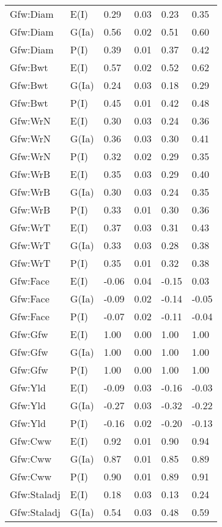 \begin{center}
\begin{longtable}{|p{1.1in}|p{0.7in}|p{0.7in}|p{0.6in}|p{0.6in}|p{0.6in}|}
  Gfw:Diam & E(I) & 0.29 & 0.03 & 0.23 & 0.35 \\ 
  Gfw:Diam & G(Ia) & 0.56 & 0.02 & 0.51 & 0.60 \\ 
  Gfw:Diam & P(I) & 0.39 & 0.01 & 0.37 & 0.42 \\ 
  Gfw:Bwt & E(I) & 0.57 & 0.02 & 0.52 & 0.62 \\ 
  Gfw:Bwt & G(Ia) & 0.24 & 0.03 & 0.18 & 0.29 \\ 
  Gfw:Bwt & P(I) & 0.45 & 0.01 & 0.42 & 0.48 \\ 
  Gfw:WrN & E(I) & 0.30 & 0.03 & 0.24 & 0.36 \\ 
  Gfw:WrN & G(Ia) & 0.36 & 0.03 & 0.30 & 0.41 \\ 
  Gfw:WrN & P(I) & 0.32 & 0.02 & 0.29 & 0.35 \\ 
  Gfw:WrB & E(I) & 0.35 & 0.03 & 0.29 & 0.40 \\ 
  Gfw:WrB & G(Ia) & 0.30 & 0.03 & 0.24 & 0.35 \\ 
  Gfw:WrB & P(I) & 0.33 & 0.01 & 0.30 & 0.36 \\ 
  Gfw:WrT & E(I) & 0.37 & 0.03 & 0.31 & 0.43 \\ 
  Gfw:WrT & G(Ia) & 0.33 & 0.03 & 0.28 & 0.38 \\ 
  Gfw:WrT & P(I) & 0.35 & 0.01 & 0.32 & 0.38 \\ 
  Gfw:Face & E(I) & -0.06 & 0.04 & -0.15 & 0.03 \\ 
  Gfw:Face & G(Ia) & -0.09 & 0.02 & -0.14 & -0.05 \\ 
  Gfw:Face & P(I) & -0.07 & 0.02 & -0.11 & -0.04 \\ 
  Gfw:Gfw & E(I) & 1.00 & 0.00 & 1.00 & 1.00 \\ 
  Gfw:Gfw & G(Ia) & 1.00 & 0.00 & 1.00 & 1.00 \\ 
  Gfw:Gfw & P(I) & 1.00 & 0.00 & 1.00 & 1.00 \\ 
  Gfw:Yld & E(I) & -0.09 & 0.03 & -0.16 & -0.03 \\ 
  Gfw:Yld & G(Ia) & -0.27 & 0.03 & -0.32 & -0.22 \\ 
  Gfw:Yld & P(I) & -0.16 & 0.02 & -0.20 & -0.13 \\ 
  Gfw:Cww & E(I) & 0.92 & 0.01 & 0.90 & 0.94 \\ 
  Gfw:Cww & G(Ia) & 0.87 & 0.01 & 0.85 & 0.89 \\ 
  Gfw:Cww & P(I) & 0.90 & 0.01 & 0.89 & 0.91 \\ 
  Gfw:Staladj & E(I) & 0.18 & 0.03 & 0.13 & 0.24 \\ 
  Gfw:Staladj & G(Ia) & 0.54 & 0.03 & 0.48 & 0.59 \\ 

\end{longtable}
\end{center}
